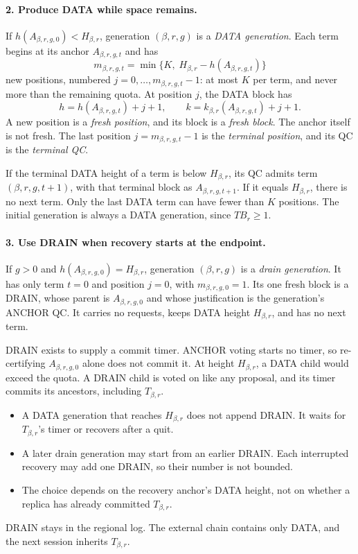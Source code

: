 \documentclass[11pt,a4paper]{article}
\newcommand{\TB}{\mathit{TB}}
\newcommand{\defterm}[1]{\textcolor{rrBlue}{\textit{#1}}}
\begin{document}
\paragraph{2. Produce DATA while space remains.}
If $h(A_{\beta,r,g,0})<H_{\beta,r}$, generation $(\beta,r,g)$ is a
\defterm{DATA generation}. Each term begins at its anchor
$A_{\beta,r,g,t}$ and has
\[
 m_{\beta,r,g,t}=\min\{K,\;H_{\beta,r}-h(A_{\beta,r,g,t})\}
\]
new positions, numbered $j=0,\ldots,m_{\beta,r,g,t}-1$: at most $K$ per
term, and never more than the remaining quota. At position $j$, the DATA
block has
\[
 h=h(A_{\beta,r,g,t})+j+1,\qquad
 k=k_{\beta,r}(A_{\beta,r,g,t})+j+1.
\]
A new position is a \defterm{fresh position}, and its block is a
\defterm{fresh block}. The anchor itself is not fresh. The last position
$j=m_{\beta,r,g,t}-1$ is the \defterm{terminal position}, and its QC is
the \defterm{terminal QC}.

If the terminal DATA height of a term is below $H_{\beta,r}$, its QC
admits term $(\beta,r,g,t+1)$, with that terminal block as
$A_{\beta,r,g,t+1}$. If it equals $H_{\beta,r}$, there is no next term.
Only the last DATA term can have fewer than $K$ positions. The initial
generation is always a DATA generation, since $\TB_r\ge1$.

\paragraph{3. Use DRAIN when recovery starts at the endpoint.}
If $g>0$ and $h(A_{\beta,r,g,0})=H_{\beta,r}$, generation $(\beta,r,g)$ is
a \defterm{drain generation}. It has only term $t=0$ and position $j=0$,
with $m_{\beta,r,g,0}=1$. Its one fresh block is a DRAIN, whose parent is
$A_{\beta,r,g,0}$ and whose justification is the generation's ANCHOR QC.
It carries no requests, keeps DATA height $H_{\beta,r}$, and has no next
term.

DRAIN exists to supply a commit timer. ANCHOR voting starts no timer, so
re-certifying $A_{\beta,r,g,0}$ alone does not commit it. At height
$H_{\beta,r}$, a DATA child would exceed the quota. A DRAIN child is
voted on like any proposal, and its timer commits its ancestors,
including $T_{\beta,r}$.
\begin{itemize}
\item A DATA generation that reaches $H_{\beta,r}$ does not append DRAIN.
It waits for $T_{\beta,r}$'s timer or recovers after a quit.
\item A later drain generation may start from an earlier DRAIN.
Each interrupted recovery may add one DRAIN, so their number is not
bounded.
\item The choice depends on the recovery anchor's DATA height, not on
whether a replica has already committed $T_{\beta,r}$.
\end{itemize}
DRAIN stays in the regional log. The external chain contains only DATA,
and the next session inherits $T_{\beta,r}$.
\end{document}
